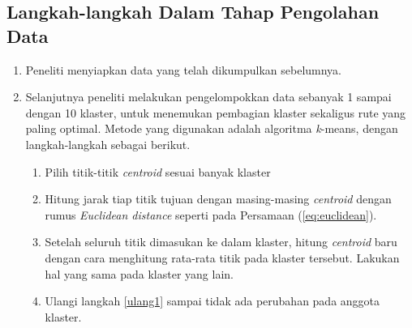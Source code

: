 \subsection{Langkah-langkah Dalam Tahap Pengolahan Data}
\begin{enumerate}
    \item Peneliti menyiapkan data yang telah dikumpulkan sebelumnya.
    \item Selanjutnya peneliti melakukan pengelompokkan data sebanyak 1 sampai dengan 10 klaster, untuk menemukan pembagian klaster sekaligus rute yang paling optimal. Metode yang digunakan adalah algoritma \textit{k}-means, dengan langkah-langkah sebagai berikut.
    \begin{enumerate}
        \item Pilih titik-titik \textit{centroid} sesuai banyak klaster
        \item \label{ulang1} Hitung jarak tiap titik tujuan dengan masing-masing \textit{centroid} dengan rumus \textit{Euclidean distance} seperti pada Persamaan (\ref{eq:euclidean}).
        \item Setelah seluruh titik dimasukan ke dalam klaster, hitung \textit{centroid} baru dengan cara menghitung rata-rata titik pada klaster tersebut. Lakukan hal yang sama pada klaster yang lain.
        \item Ulangi langkah \ref{ulang1} sampai tidak ada perubahan pada anggota klaster.
    \end{enumerate}
	

\end{enumerate}
